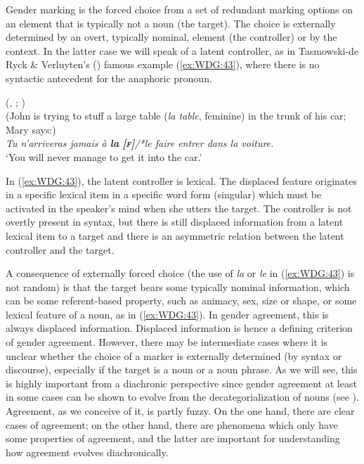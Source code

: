\documentclass[output=collectionpaper]{langsci/langscibook}
\begin{document}
Gender marking is the forced choice from a set of redundant marking options on an element that is typically not a noun (the target). The choice is externally determined by an overt, typically nominal, element (the controller) or by the context. In the latter case we will speak of a latent controller, as in Tasmowski-de Ryck \& Verluyten's (\citealt*[328]{Tasmowski1982}) famous  example (\ref{ex:WDG:43}), where there is no syntactic antecedent for the anaphoric pronoun.

\ea\label{ex:WDG:43}
 (, ; \citealt[328]{Tasmowski1982})\\
(John is trying to stuff a large table (\textit{la table}, feminine) in the trunk of his car; Mary says:)\\
\textit{Tu n'arriveras jamais à \textbf{la} {\normalfont \textbf{[\textsc{f}]}}/*le {\normalfont [\textsc{m}]} faire entrer dans la voiture.}\\
`You will never manage to get it into the car.'\\
\z

In (\ref{ex:WDG:43}), the latent controller is lexical. The displaced feature originates in a specific lexical item in a specific word form (singular) which must be activated in the speaker's mind when she utters the target. The controller is not overtly present in syntax, but there is still displaced information from a latent lexical item to a target and there is an asymmetric relation between the latent controller and the target.

A consequence of externally forced choice (the use of \textit{la} or \textit{le} in (\ref{ex:WDG:43}) is not random) is that the target bears some typically nominal information, which can be some referent-based property, such as animacy, sex, size or shape, or some lexical feature of a noun, as in (\ref{ex:WDG:43}). In gender agreement, this is always displaced information. Displaced information is hence a defining criterion of gender agreement. However, there may be intermediate cases where it is unclear whether the choice of a marker is externally determined (by syntax or discourse), especially if the target is a noun or a noun phrase. As we will see, this is highly important from a diachronic perspective since gender agreement at least in some cases can be shown to evolve from the decategorialization of nouns (see ). Agreement, as we conceive of it, is partly fuzzy. On the one hand, there are clear cases of agreement; on the other hand, there are phenomena which only have some properties of agreement, and the latter are important for understanding how agreement evolves diachronically.
\end{document}
